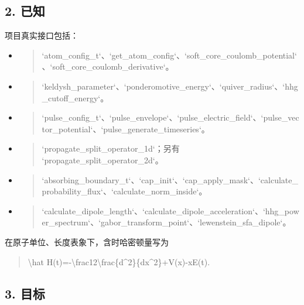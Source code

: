 \documentclass[UTF8,openany,11pt,fontset=fandol]{ctexbook}
\begin{document}
\subsection{\texorpdfstring{\textbf{2.
已知}}{2. 已知}}\label{ux5df2ux77e5-1}

项目真实接口包括：

\begin{itemize}
\item
  \begin{quote}
  `atom\_config\_t`、`get\_atom\_config`、`soft\_core\_coulomb\_potential`、`soft\_core\_coulomb\_derivative`。
  \end{quote}
\item
  \begin{quote}
  `keldysh\_parameter`、`ponderomotive\_energy`、`quiver\_radius`、`hhg\_cutoff\_energy`。
  \end{quote}
\item
  \begin{quote}
  `pulse\_config\_t`、`pulse\_envelope`、`pulse\_electric\_field`、`pulse\_vector\_potential`、`pulse\_generate\_timeseries`。
  \end{quote}
\item
  \begin{quote}
  `propagate\_split\_operator\_1d`；另有
  `propagate\_split\_operator\_2d`。
  \end{quote}
\item
  \begin{quote}
  `absorbing\_boundary\_t`、`cap\_init`、`cap\_apply\_mask`、`calculate\_probability\_flux`、`calculate\_norm\_inside`。
  \end{quote}
\item
  \begin{quote}
  `calculate\_dipole\_length`、`calculate\_dipole\_acceleration`、`hhg\_power\_spectrum`、`gabor\_transform\_point`、`lewenstein\_sfa\_dipole`。
  \end{quote}
\end{itemize}

在原子单位、长度表象下，含时哈密顿量写为

\begin{quote}
\textbackslash hat
H(t)=-\textbackslash frac12\textbackslash frac\{d\^{}2\}\{dx\^{}2\}+V(x)-xE(t).
\end{quote}

\subsection{\texorpdfstring{\textbf{3.
目标}}{3. 目标}}\label{ux76eeux6807-1}
\end{document}

